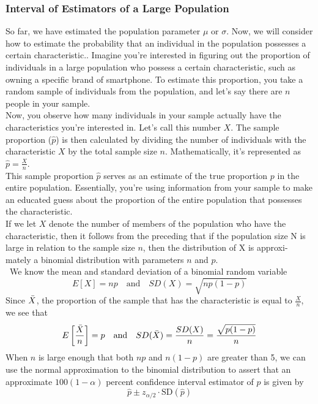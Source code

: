 \documentclass[12pt,a4paper]{article}
\theoremstyle{example}
\theoremstyle{definition}
\theoremstyle{theorem}
\begin{document}
\subsubsection{Interval of Estimators of a Large Population}
So far, we have estimated the population parameter $\mu$ or $\sigma$. Now, we will consider how to estimate the probability that an individual in the population possesses a certain characteristic..
Imagine you're interested in figuring out the proportion of individuals in a large population who possess a certain characteristic, such as owning a specific brand of smartphone. To estimate this proportion, you take a random sample of individuals from the population, and let's say there are $n$ people in your sample.\\

Now, you observe how many individuals in your sample actually have the characteristics you're interested in. Let's call this number $X$. The sample proportion ($\hat{p}$) is then calculated by dividing the number of individuals with the characteristic $X$ by the total sample size $n$. Mathematically, it's represented as $\hat{p}=\frac{X}{n}$.\\

This sample proportion $\hat{p}$ serves as an estimate of the true proportion $p$ in the entire population. Essentially, you're using information from your sample to make an educated guess about the proportion of the entire population that possesses the characteristic.\\

If we let $X$ denote the number of members of the population who have the
characteristic, then it follows from the preceding that if the population size N
is large in relation to the sample size $n$, then the distribution of X is approxi-
mately a binomial distribution with parameters $n$ and $p$.\\\
We know the mean and standard deviation of a binomial random variable
\[
E[X] = np \quad \text{and} \quad SD(X) = \sqrt{np(1 - p)}
\]
Since $\Bar{X}$, the proportion of the sample that has the characteristic is equal to \(\frac{X}{n}\), we see that
\[
E\left[\frac{\Bar{X}}{n}\right] = p \quad \text{and} \quad SD(\bar{X})=\frac{SD(X)}{n} = \frac{\sqrt{p(1 - p)}}{n}
\]
When \(n\) is large enough that both \(np\) and \(n(1 - p)\) are greater than 5, we can use the normal approximation to the binomial distribution to assert that an approximate \(100(1 - \alpha)\) percent confidence interval estimator of \(p\) is given by
\[ \hat{p} \pm z_{\alpha/2} \cdot \text{SD}(\hat{p}) \]
\end{document}
